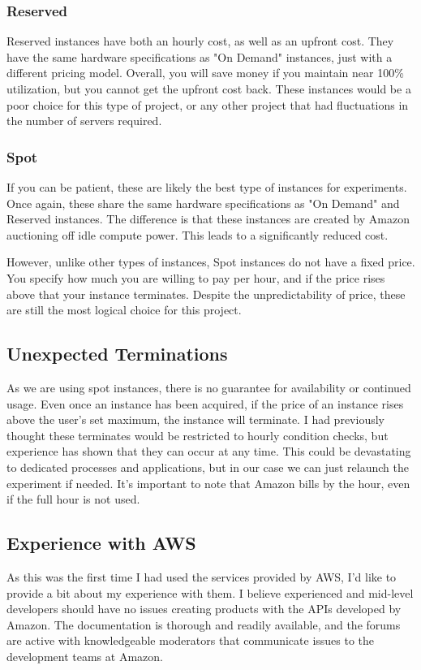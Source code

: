 \documentclass{article}
\begin{document}
\subsubsection{Reserved}
Reserved instances have both an hourly cost, as well as an upfront cost. They have the same hardware specifications as "On Demand" instances, just with a different pricing model. Overall, you will save money if you maintain near 100\% utilization, but you cannot get the upfront cost back. These instances would be a poor choice for this type of project, or any other project that had fluctuations in the number of servers required.
\subsubsection{Spot}
If you can be patient, these are likely the best type of instances for experiments. Once again, these share the same hardware specifications as "On Demand" and Reserved instances. The difference is that these instances are created by Amazon auctioning off idle compute power. This leads to a significantly reduced cost.

However, unlike other types of instances, Spot instances do not have a fixed price. You specify how much you are willing to pay per hour, and if the price rises above that your instance terminates. Despite the unpredictability of price, these are still the most logical choice for this project.
\subsection{Unexpected Terminations}
As we are using spot instances, there is no guarantee for availability or continued usage. Even once an instance has been acquired, if the price of an instance rises above the user's set maximum, the instance will terminate. I had previously thought these terminates would be restricted to hourly condition checks, but experience has shown that they can occur at any time. This could be devastating to dedicated processes and applications, but in our case we can just relaunch the experiment if needed. It's important to note that Amazon bills by the hour, even if the full hour is not used.
\subsection{Experience with AWS}
As this was the first time I had used the services provided by AWS, I'd like to provide a bit about my experience with them. I believe experienced and mid-level developers should have no issues creating products with the APIs developed by Amazon. The documentation is thorough and readily available, and the forums are active with knowledgeable moderators that communicate issues to the development teams at Amazon.
\end{document}
